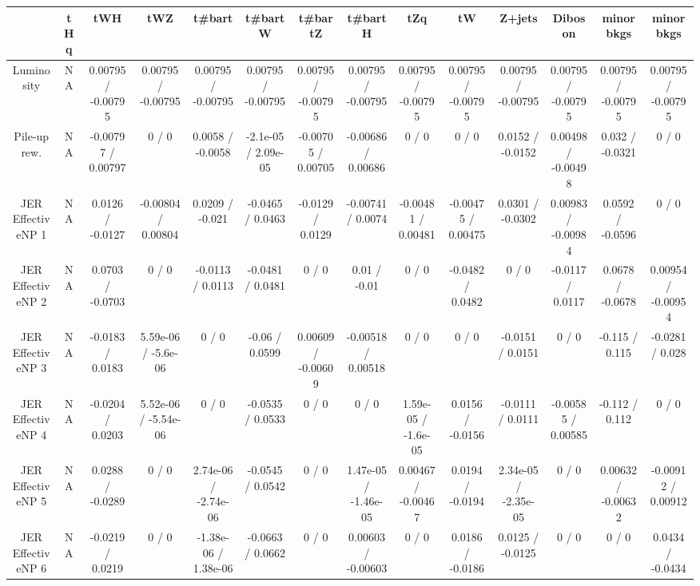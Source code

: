 \documentclass[10pt]{article}
\begin{document}
\begin{table}[htbp]
\begin{center}
\begin{tabular}{|c|c|c|c|c|c|c|c|c|c|c|c|c|c|}
\hline 
      & tHq      & tWH      & tWZ      & t#bar{t}      & t#bar{t}W      & t#bar{t}Z      & t#bar{t}H      & tZq      & tW      & Z+jets      & Diboson      & minor bkgs      & minor bkgs \\ 
\hline 
  Luminosity &    NA    & 0.00795 / -0.00795 & 0.00795 / -0.00795 & 0.00795 / -0.00795 & 0.00795 / -0.00795 & 0.00795 / -0.00795 & 0.00795 / -0.00795 & 0.00795 / -0.00795 & 0.00795 / -0.00795 & 0.00795 / -0.00795 & 0.00795 / -0.00795 & 0.00795 / -0.00795 & 0.00795 / -0.00795 \\ 
  Pile-up rew. &    NA    & -0.00797 / 0.00797 & 0 / 0 & 0.0058 / -0.0058 & -2.1e-05 / 2.09e-05 & -0.00705 / 0.00705 & -0.00686 / 0.00686 & 0 / 0 & 0 / 0 & 0.0152 / -0.0152 & 0.00498 / -0.00498 & 0.032 / -0.0321 & 0 / 0 \\ 
  JER EffectiveNP 1 &    NA    & 0.0126 / -0.0127 & -0.00804 / 0.00804 & 0.0209 / -0.021 & -0.0465 / 0.0463 & -0.0129 / 0.0129 & -0.00741 / 0.0074 & -0.00481 / 0.00481 & -0.00475 / 0.00475 & 0.0301 / -0.0302 & 0.00983 / -0.00984 & 0.0592 / -0.0596 & 0 / 0 \\ 
  JER EffectiveNP 2 &    NA    & 0.0703 / -0.0703 & 0 / 0 & -0.0113 / 0.0113 & -0.0481 / 0.0481 & 0 / 0 & 0.01 / -0.01 & 0 / 0 & -0.0482 / 0.0482 & 0 / 0 & -0.0117 / 0.0117 & 0.0678 / -0.0678 & 0.00954 / -0.00954 \\ 
  JER EffectiveNP 3 &    NA    & -0.0183 / 0.0183 & 5.59e-06 / -5.6e-06 & 0 / 0 & -0.06 / 0.0599 & 0.00609 / -0.00609 & -0.00518 / 0.00518 & 0 / 0 & 0 / 0 & -0.0151 / 0.0151 & 0 / 0 & -0.115 / 0.115 & -0.0281 / 0.028 \\ 
  JER EffectiveNP 4 &    NA    & -0.0204 / 0.0203 & 5.52e-06 / -5.54e-06 & 0 / 0 & -0.0535 / 0.0533 & 0 / 0 & 0 / 0 & 1.59e-05 / -1.6e-05 & 0.0156 / -0.0156 & -0.0111 / 0.0111 & -0.00585 / 0.00585 & -0.112 / 0.112 & 0 / 0 \\ 
  JER EffectiveNP 5 &    NA    & 0.0288 / -0.0289 & 0 / 0 & 2.74e-06 / -2.74e-06 & -0.0545 / 0.0542 & 0 / 0 & 1.47e-05 / -1.46e-05 & 0.00467 / -0.00467 & 0.0194 / -0.0194 & 2.34e-05 / -2.35e-05 & 0 / 0 & 0.00632 / -0.00632 & -0.00912 / 0.00912 \\ 
  JER EffectiveNP 6 &    NA    & -0.0219 / 0.0219 & 0 / 0 & -1.38e-06 / 1.38e-06 & -0.0663 / 0.0662 & 0 / 0 & 0.00603 / -0.00603 & 0 / 0 & 0.0186 / -0.0186 & 0.0125 / -0.0125 & 0 / 0 & 0 / 0 & 0.0434 / -0.0434 \\ 

\end{tabular}
\end{center}
\end{table}
\end{document}

